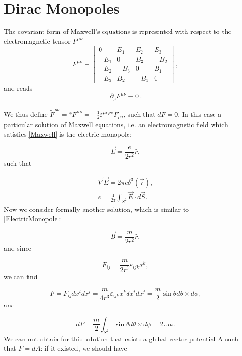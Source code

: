 \documentclass[main.tex]{subfiles}
\begin{document}
\section{Dirac Monopoles}
The covariant form of Maxwell's equations is represented with respect to  the electromagnetic tensor $F^{\mu \nu}$
%
\begin{equation}
  F^{\mu\nu} = \begin{bmatrix}
  0   & E_1  & E_2  & E_3 \\
  -E_1   & 0  & B_3  & -B_2 \\
  -E_2   & -B_3  & 0  & B_1 \\
  -E_3   & B_2  & -B_1  & 0
  \end{bmatrix}\,,
\end{equation}
%
and reads
\begin{equation}\label{Maxwell}
\partial_{\mu}F^{\mu \nu}=0\,.
\end{equation}

We thus define
$\tilde{F}^{\mu\nu}=*F^{\mu\nu}=-\frac{1}{2}\varepsilon^{\mu \nu \rho \sigma}F_{\rho \sigma}$,
such that $dF=0$.
In this case a particular solution of Maxwell equations, i.e. an electromagnetic field which satisfies \eqref{Maxwell} is the electric monopole:

\begin{equation}\label{ElectricMonopole}
\vec E=\frac{e}{2r^2}\hat{r},
\end{equation}
such that

\begin{align}
\vec \nabla \vec E=2\pi e \delta^3(\vec r),\\
e=\frac{1}{2\pi}\int_{S^2}\vec E \cdot d\vec S.
\end{align}
Now we consider formally another solution, which is similar to \eqref{ElectricMonopole}:

\begin{equation}\label{MagneticMonopole}
\vec B=\frac{m}{2r^2}\hat{r},
\end{equation}
and since

\begin{equation}
F_{ij}=\frac{m}{2r^3}\varepsilon_{ijk}x^k,
\end{equation}
we can find

\begin{equation}
F=F_{ij}dx^idx^j=\frac{m}{4r^3}\varepsilon_{ijk}x^kdx^idx^j=\frac{m}{2}\sin\theta d\theta\times d\phi,
\end{equation}
and

\begin{equation}
dF=\frac{m}{2}\int_{S^2}\sin\theta d\theta\times d\phi=2\pi m.
\end{equation}
We can not obtain for this solution that exists a global vector potential A such that $F=dA$: if it existed, we should have
\end{document}
